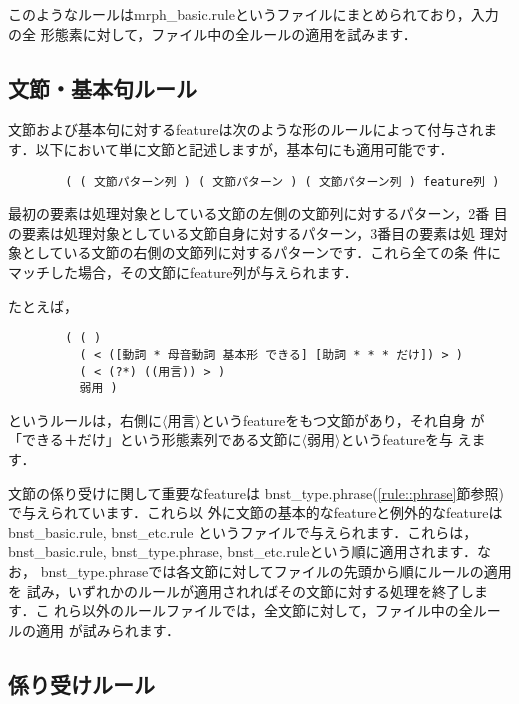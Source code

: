 \documentclass[a4j,11pt,titlepage]{jarticle}
\def\fl{$\langle$}
\def\fr{$\rangle$}
\begin{document}
このようなルールはmrph\_basic.ruleというファイルにまとめられており，入力の全
形態素に対して，ファイル中の全ルールの適用を試みます．


\subsection{文節・基本句ルール}

文節および基本句に対するfeatureは次のような形のルールによって付与されま
す．以下において単に文節と記述しますが，基本句にも適用可能です．
\begin{verbatim}
        ( ( 文節パターン列 ) ( 文節パターン ) ( 文節パターン列 ) feature列 )
\end{verbatim}
最初の要素は処理対象としている文節の左側の文節列に対するパターン，2番
目の要素は処理対象としている文節自身に対するパターン，3番目の要素は処
理対象としている文節の右側の文節列に対するパターンです．これら全ての条
件にマッチした場合，その文節にfeature列が与えられます．

たとえば，
\begin{verbatim}
        ( ( )
          ( < ([動詞 * 母音動詞 基本形 できる] [助詞 * * * だけ]) > )
          ( < (?*) ((用言)) > )
          弱用 )
\end{verbatim}
というルールは，右側に\fl 用言\fr というfeatureをもつ文節があり，それ自身
が「できる＋だけ」という形態素列である文節に\fl 弱用\fr というfeatureを与
えます．

文節の係り受けに関して重要なfeatureは
bnst\_type.phrase(\ref{rule::phrase}節参照)で与えられています．これら以
外に文節の基本的なfeatureと例外的なfeatureはbnst\_basic.rule,
bnst\_etc.rule というファイルで与えられます．これらは，bnst\_basic.rule,
bnst\_type.phrase, bnst\_etc.ruleという順に適用されます．なお，
bnst\_type.phraseでは各文節に対してファイルの先頭から順にルールの適用を
試み，いずれかのルールが適用されればその文節に対する処理を終了します．こ
れら以外のルールファイルでは，全文節に対して，ファイル中の全ルールの適用
が試みられます．


\subsection{係り受けルール}
\end{document}
